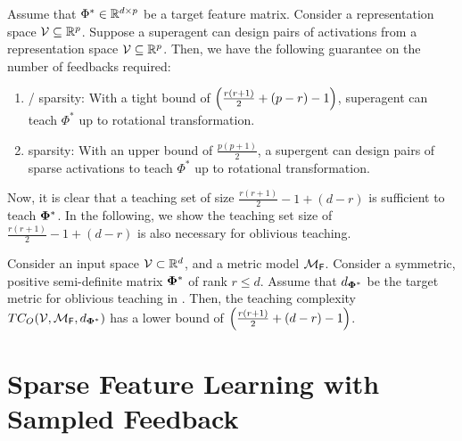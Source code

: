 \begin{theorem}\label{thm: constructive}
    Assume that $\Phi^* \in \mathbb{R}^{d \times p}$ be a target feature matrix. 
    Consider a representation space ${\mathcal{V}} \subseteq \mathbb{R}^p$. Suppose a superagent can design pairs of activations from a representation space ${\mathcal{V}} \subseteq \mathbb{R}^p$. Then, we have the following guarantee on the number of feedbacks required:
    \begin{enumerate}
        \item {}/ sparsity: With a tight bound of $ \left( {\frac{r(r+1)}{2} + (p - r) - 1} \right) $, superagent can teach $\Phi^*$ up to rotational transformation.
        \item sparsity: With an upper bound of $\frac{p(p+1)}{2}$, a supergent can design pairs of sparse activations to teach $\Phi^*$ up to rotational transformation.
    \end{enumerate}
\end{theorem}

Now, it is clear that a teaching set of size $\frac{r(r+1)}{2} - 1 + (d -r)$ is sufficient to teach $\boldsymbol{\Phi}^*$. In the following, we show the teaching set size of $\frac{r(r+1)}{2} - 1 + (d -r)$ is also necessary for oblivious teaching.

\begin{lemma}\label{lemma: lowerbound}
    Consider an input space ${\mathcal{V}} \subset \mathbb{R}^d$, and a metric model ${\mathcal{M}}_{\textsf{F}}$.
    Consider a symmetric, positive semi-definite matrix $\boldsymbol{\Phi}^*$ of rank $r \le d$. Assume that $d_{\boldsymbol{\Phi}^*}$ be the target metric for oblivious teaching in . Then, the teaching complexity $TC_O({\mathcal{V}}, {\mathcal{M}}_{\textsf{F}}, d_{\boldsymbol{\Phi}^*})$ has a lower bound of $ \left( {\frac{r(r+1)}{2} + (d - r) - 1} \right) $.
\end{lemma}
\fi

\section{Sparse Feature Learning with Sampled Feedback}\label{sec: sample}

